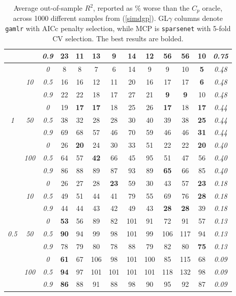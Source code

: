 \documentclass[12pt]{article}
\begin{document}
\begin{table}
\begin{center}
\begin{tabular}{ccc|cc|cc|cc|cc|c|c}
& & \it  0.9  & 23 & 11 & 13 & {\bf 9} & 14 & 12 & 56 & 56 & 10 & \it  0.75 \\[1ex]
\cline{2-3}\hline\rule{0pt}{3ex}
& & \it  0  & 8 & 8 & 7 & 6 & 14 & 9 & 9 & 10 & {\bf 5} & \it  0.48 \\
 & \it  10  & \it  0.5  & 16 & 16 & 12 & 11 & 20 & 16 & 17 & 17 & {\bf 6} & \it  0.48 \\
& & \it  0.9  & 22 & 22 & 18 & 17 & 27 & 21 & {\bf 9} & {\bf 9} & 10 & \it  0.48 \\[1ex]
\cline{2-3}\rule{0pt}{3ex}
& & \it  0  & 19 & {\bf 17} & {\bf 17} & 18 & 25 & 26 & {\bf 17} & 18 & {\bf 17} & \it  0.44 \\
\it  1  & \it  50  & \it  0.5  & 38 & 32 & 28 & 28 & 30 & 40 & 39 & 38 & {\bf 25} & \it  0.44 \\
& & \it  0.9  & 69 & 68 & 57 & 46 & 70 & 59 & 46 & 46 & {\bf 31} & \it  0.44 \\[1ex]
\cline{2-3}\rule{0pt}{3ex}
& & \it  0  & 26 & {\bf 20} & 24 & 30 & 33 & 51 & 22 & 22 & {\bf 20} & \it  0.40 \\
 & \it  100  & \it  0.5  & 64 & 57 & {\bf 42} & 66 & 45 & 95 & 51 & 47 & 56 & \it  0.40 \\
& & \it  0.9  & 86 & 88 & 89 & 87 & 93 & 89 & {\bf 65} & 66 & 85 & \it  0.40 \\[1ex]
\cline{2-3}\hline\rule{0pt}{3ex}
& & \it  0  & 26 & 27 & 28 & {\bf 23} & 59 & 30 & 43 & 57 & {\bf 23} & \it  0.18 \\
 & \it  10  & \it  0.5  & 49 & 51 & 44 & 41 & 79 & 55 & 69 & 76 & {\bf 28} & \it  0.18 \\
& & \it  0.9  & 44 & 44 & 43 & 42 & 49 & 43 & {\bf 28} & {\bf 28} & 39 & \it  0.18 \\[1ex]
\cline{2-3}\rule{0pt}{3ex}
& & \it  0  & {\bf 53} & 56 & 89 & 82 & 101 & 91 & 72 & 91 & 57 & \it  0.13 \\
\it  0.5  & \it  50  & \it  0.5  & {\bf 90} & 94 & 99 & 98 & 101 & 99 & 106 & 117 & 94 & \it  0.13 \\
& & \it  0.9  & 78 & 79 & 80 & 78 & 88 & 79 & 82 & 80 & {\bf 75} & \it  0.13 \\[1ex]
\cline{2-3}\rule{0pt}{3ex}
& & \it  0  & {\bf 61} & 67 & 106 & 98 & 101 & 100 & 85 & 115 & 68 & \it  0.09 \\
 & \it  100  & \it  0.5  & {\bf 94} & 97 & 101 & 101 & 101 & 101 & 118 & 132 & 98 & \it  0.09 \\
& & \it  0.9  & {\bf 86} & 88 & 91 & 88 & 98 & 90 & 95 & 92 & 87 & \it  0.09 \\[1ex]
\hline
\end{tabular}
\end{center}
\caption{\label{tab:sim} Average out-of-sample $R^2$, reported as  \% worse than the $C_p$ oracle, across 1000 different samples from (\ref{simdgp}).   GL$\gamma$ columns denote {\tt gamlr} with AICc penalty selection, while MCP is {\tt sparsenet} with 5-fold CV selection. The best results are bolded.}
\end{table}
\end{document}
